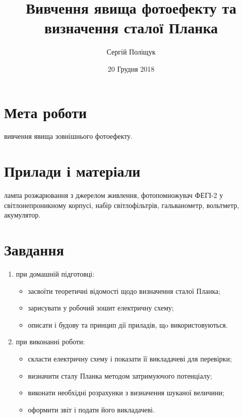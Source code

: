 \documentclass[twocolumn]{el-author}
\date{20 Грудня 2018}
\begin{document}
\title{Вивчення явища фотоефекту та визначення сталої Планка}

\author{Сергій Поліщук}


\maketitle

\section{Мета роботи}

вивчення явища зовнішнього фотоефекту. 

\section{Прилади і матеріали}

лампа розжарювання з джерелом живлення,
фотопомножувач ФЕГІ-2 у світлонепроникному корпусі,
набір світлофільтрів, гальванометр, вольтметр, акумулятор.

\section{Завдання}

\begin{enumerate}
	\item при домашній підготовці:
	\begin{itemize}
		\item  засвоїти теоретичні відомості щодо визначення сталої
Планка;
		\item  зарисувати у робочий зошит електричну схему;
		\item  описати і будову та принцип дії приладів, щo використовуються.
	\end{itemize}
	\item при виконанні роботи:
	\begin{itemize}
		\item  скласти електричну схему і показати її викладачеві для перевірки;
		\item  визначити сталу Планка методом затримуючого потенціалу;
		\item  виконати необхідні розрахунки з визначення шуканої величини;
		\item  оформити звіт і подати його викладачеві.
	\end{itemize}
	
\end{enumerate}
\end{document}
